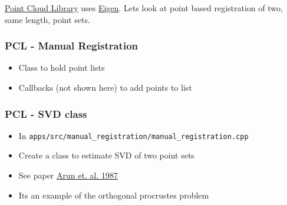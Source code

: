 \href{http://pointclouds.org/}{Point Cloud Library} uses
\href{http://eigen.tuxfamily.org}{Eigen}. Lets look at point based
registration of two, same length, point sets.

\subsubsection{PCL - Manual
Registration}\label{pcl---manual-registration}

\begin{itemize}
\itemsep1pt\parskip0pt
\item
  Class to hold point lists
\item
  Callbacks (not shown here) to add points to list
\end{itemize}

\begin{Shaded}
\begin{Highlighting}[]
  
\NormalTok{\{}
  \NormalTok{:}
\end{Highlighting}
\end{Shaded}

\subsubsection{PCL - SVD class}\label{pcl---svd-class}

\begin{itemize}
\itemsep1pt\parskip0pt
\item
  In \texttt{apps/src/manual\_registration/manual\_registration.cpp}
\item
  Create a class to estimate SVD of two point sets
\item
  See paper \href{http://dl.acm.org/citation.cfm?id=28821}{Arun et. al.
  1987}
\item
  Its an example of the orthogonal procrustes problem
\end{itemize}

\begin{Shaded}
\begin{Highlighting}[]
\end{Highlighting}
\end{Shaded}

